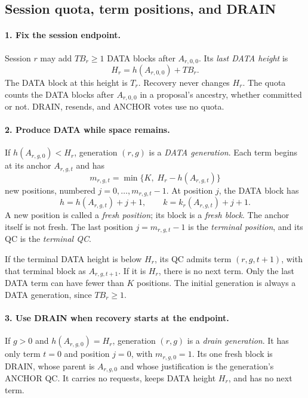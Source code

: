 \documentclass[11pt,a4paper]{article}
\newcommand{\TB}{\mathit{TB}}
\newcommand{\defterm}[1]{\textcolor{rrBlue}{\textit{#1}}}
\begin{document}
\subsection{Session quota, term positions, and DRAIN}
\label{sec:quota}
\paragraph{1. Fix the session endpoint.}
Session $r$ may add $\TB_r\ge1$ DATA blocks after $A_{r,0,0}$. Its \defterm{last
DATA height} is
\[
 H_r=h(A_{r,0,0})+\TB_r.
\]
The DATA block at this height is $T_r$. Recovery never changes $H_r$.
The quota counts the DATA blocks after $A_{r,0,0}$ in a proposal's
ancestry, whether committed or not. DRAIN, resends, and ANCHOR votes
use no quota.

\paragraph{2. Produce DATA while space remains.}
If $h(A_{r,g,0})<H_r$, generation $(r,g)$ is a \defterm{DATA generation}.
Each term begins at its anchor $A_{r,g,t}$ and has
\[
 m_{r,g,t}=\min\{K,\;H_r-h(A_{r,g,t})\}
\]
new positions, numbered $j=0,\ldots,m_{r,g,t}-1$. At position $j$, the
DATA block has
\[
 h=h(A_{r,g,t})+j+1,\qquad
 k=k_r(A_{r,g,t})+j+1.
\]
A new position is called a \defterm{fresh position}; its block is a
\defterm{fresh block}. The anchor itself is not fresh. The last position
$j=m_{r,g,t}-1$ is the \defterm{terminal position}, and its QC is the
\defterm{terminal QC}.

If the terminal DATA height is below $H_r$, its QC admits term
$(r,g,t+1)$, with that terminal block as $A_{r,g,t+1}$. If it is $H_r$,
there is no next term. Only the last DATA term can have fewer than $K$
positions. The initial generation is always a DATA generation, since
$\TB_r\ge1$.

\paragraph{3. Use DRAIN when recovery starts at the endpoint.}
If $g>0$ and $h(A_{r,g,0})=H_r$, generation $(r,g)$ is a
\defterm{drain generation}. It has only term $t=0$ and position $j=0$,
with $m_{r,g,0}=1$. Its one fresh block is DRAIN, whose parent is
$A_{r,g,0}$ and whose justification is the generation's ANCHOR QC.
It carries no requests, keeps DATA height $H_r$, and has no next term.
\end{document}
